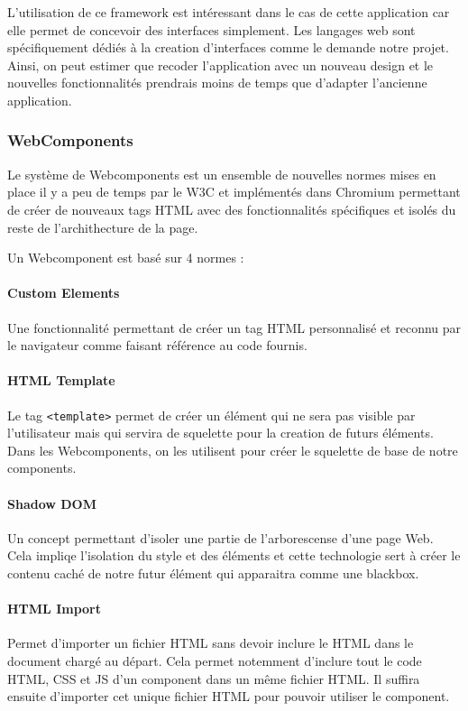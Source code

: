 L'utilisation de ce framework est intéressant dans le cas de cette application car elle permet de concevoir des interfaces simplement.
Les langages web sont spécifiquement dédiés à la creation d'interfaces comme le demande notre projet.
Ainsi, on peut estimer que recoder l'application avec un nouveau design et le nouvelles fonctionnalités prendrais moins de temps que d'adapter l'ancienne application.

\subsubsection{WebComponents}
\label{webcomponents}

Le système de Webcomponents est un ensemble de nouvelles normes mises en place il y a peu de temps par le W3C et implémentés dans Chromium permettant de créer de nouveaux tags HTML avec des fonctionnalités spécifiques et isolés du reste de l'archithecture de la page.

Un Webcomponent est basé sur 4 normes :

\paragraph{Custom Elements} Une fonctionnalité permettant de créer un tag HTML personnalisé et reconnu par le navigateur comme faisant référence au code fournis.

\paragraph{HTML Template} Le tag \texttt{<template>} permet de créer un élément qui ne sera pas visible par l'utilisateur mais qui servira de squelette pour la creation de futurs éléments.
Dans les Webcomponents, on les utilisent pour créer le squelette de base de notre components.

\paragraph{Shadow DOM} Un concept permettant d'isoler une partie de l'arborescense d'une page Web.
Cela impliqe l'isolation du style et des éléments et cette technologie sert à créer le contenu caché de notre futur élément qui apparaitra comme une blackbox.

\paragraph{HTML Import} Permet d'importer un fichier HTML sans devoir inclure le HTML dans le document chargé au départ.
Cela permet notemment d'inclure tout le code HTML, CSS et JS d'un component dans un même fichier HTML.
Il suffira ensuite d'importer cet unique fichier HTML pour pouvoir utiliser le component.

